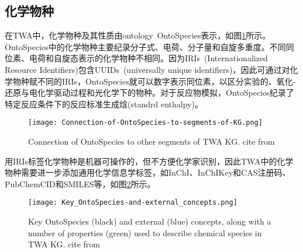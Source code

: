 \subsection{化学物种}
在\textrm{TWA}中，化学物种及其性质由\textrm{ontology~OntoSpecies}表示，如图\ref{Fig:OntoSpecies-to-segments-TWA}所示。\textrm{OntoSpecies}中的化学物种主要纪录分子式、电荷、分子量和自旋多重度。不同同位素、电荷和自旋态表示的化学物种不相同。因为\textrm{IRIs~(Internationalized Resource Identifiers)}包含\textrm{UUIDs~(universally unique identifiers)}，因此可通过对化学物种赋不同的\textrm{IRIs}，\textrm{OntoSpecies}就可以数字表示同位素，以区分实验的、氧化-还原与电化学驱动过程和光化学下的物种。对于反应物模拟，\textrm{OntoSpecies}纪录了特定反应条件下的反应标准生成焓\textrm{(standrd enthalpy)}。
\begin{figure}[h!]
\centering
\texttt{[image: Connection-of-OntoSpecies-to-segments-of-KG.png]}
\caption{\small\textrm{Connection of OntoSpecies to other segments of TWA KG. cite from\cite{ACR56-128_2023}}}%
\label{Fig:OntoSpecies-to-segments-TWA}
\end{figure}

用\textrm{IRIs}标签化学物种是机器可操作的，但不方便化学家识别，因此\textrm{TWA}中的化学物种需要进一步添加通用化学信息学标签，如\textrm{\textrm{InChI}}、\textrm{InChIKey}和\textrm{CAS}注册码、\textrm{PubChemCID}和\textrm{SMILES}等，如图\ref{Fig:Key-OntoSpecies-and-external-concepts}所示。
\begin{figure}[h!]
\centering
\texttt{[image: Key\_OntoSpecies-and-external\_concepts.png]}
\caption{\small\textrm{Key OntoSpecies (black) and external (blue) concepts, along with a number of properties (green) used to describe chemical species in TWA KG. cite from\cite{ACR56-128_2023}}}%
\label{Fig:Key-OntoSpecies-and-external-concepts}
\end{figure}

